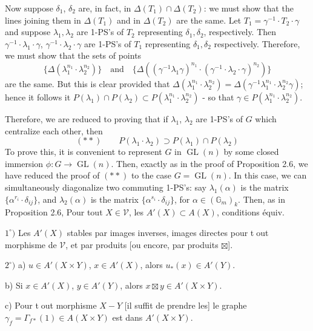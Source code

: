Now suppose $\delta_1$, $\delta_2$ are, in fact, in $\Delta(T_1)\cap\Delta(T_2)$: we must show that the lines joining them in $\Delta(T_1)$ and in $\Delta(T_2)$ are the same. Let $T_1=\gamma^{-1}\cdot T_2\cdot\gamma$ and suppose $\lambda_1,\lambda_2$ are 1-PS's of $T_2$ representing $\delta_1,\delta_2$, respectively. Then $\gamma^{-1}\cdot\lambda_1\cdot\gamma$, $\gamma^{-1}\cdot\lambda_2\cdot\gamma$ are 1-PS's of $T_1$ representing $\delta_1,\delta_2$ respectively. Therefore, we must show that the sets of points
\[
\{\Delta(\lambda_1^{n_1}\cdot\lambda_2^{n_2})\}\quad\text{and}\quad
\{\Delta((\gamma^{-1}\lambda_1\gamma)^{n_1}\cdot(\gamma^{-1}\cdot\lambda_2\cdot\gamma)^{n_2})\}
\]
are the same. But this is clear provided that $\Delta(\lambda_1^{n_1}\cdot\lambda_2^{n_2})=\Delta(\gamma^{-1}\lambda_1^{n_1}\cdot\lambda_2^{n_2}\gamma)$; hence it follows it $P(\lambda_1)\cap P(\lambda_2)\subset P(\lambda_1^{n_1}\cdot\lambda_2^{n_2})$ - so that $\gamma\in P(\lambda_1^{n_1}\cdot\lambda_2^{n_2})$.

Therefore, we are reduced to proving that if $\lambda_1$, $\lambda_2$ are 1-PS's of $G$ which centralize each other, then
\[
(**)\qquad P(\lambda_1\cdot\lambda_2)\supset P(\lambda_1)\cap P(\lambda_2)
\]
To prove this, it is convenient to represent $G$ in $\operatorname{GL}(n)$ by some closed immersion $\phi:G\longrightarrow\operatorname{GL}(n)$. Then, exactly as in the proof of Proposition 2.6, we have reduced the proof of $(**)$ to the case $G=\operatorname{GL}(n)$. In this case, we can simultaneously diagonalize two commuting 1-PS's: say $\lambda_1(\alpha)$ is the matrix $\{\alpha^{r_i}\cdot\delta_{ij}\}$, and $\lambda_2(\alpha)$ is the matrix $\{\alpha^{s_i}\cdot\delta_{ij}\}$, for $\alpha\in(\mathbb G_m)_k$. Then, as in Proposition 2.6,
Pour tout $X\in\mathcal V$, les $A'(X)\subset A(X)$,  conditions équiv.

$1^\circ)$ Les $A'(X)$ stables par images inverses, images directes pour \textcircled{tout} morphisme de $\mathcal V$, et par produits [ou encore, par produits $\boxtimes$].

$2^\circ)$  a) $u\in A'(X\times Y)$, $x\in A'(X)$, alors $u_*(x)\in A'(Y)$.

b) Si $x\in A'(X)$, $y\in A'(Y)$, alors $x\boxtimes y\in A'(X\times Y)$.

c) Pour \textcircled{tout} morphisme $X-Y$ [il suffit de prendre les\hspace{1cm}] le graphe $\gamma_f=\Gamma_{f*}(1)\in A(X\times Y)$ est dans $A'(X\times Y)$.

